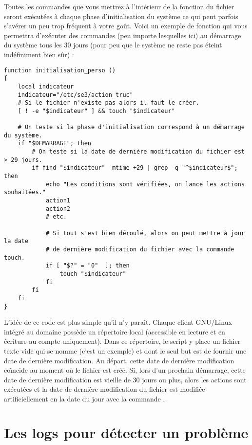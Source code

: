 Toutes les commandes que vous mettrez à l'intérieur de la fonction
 du fichier  seront
exécutées à chaque phase d'initialisation du système ce qui
peut parfois s'avérer un peu trop fréquent à votre goût.
Voici un exemple de fonction 
qui vous permettra d'exécuter des commandes (peu importe
lesquelles ici) au démarrage du système tous les 30 jours
(pour peu que le système ne reste pas éteint indéfiniment bien sûr) :
%
\begin{lstlisting}
function initialisation_perso ()
{
    local indicateur
    indicateur="/etc/se3/action_truc"
    # Si le fichier n'existe pas alors il faut le créer.
    [ ! -e "$indicateur" ] && touch "$indicateur"

    # On teste si la phase d'initialisation correspond à un démarrage du système.
    if "$DEMARRAGE"; then
        # On teste si la date de dernière modification du fichier est > 29 jours.
        if find "$indicateur" -mtime +29 | grep -q "^$indicateur$"; then
            echo "Les conditions sont vérifiées, on lance les actions souhaitées."
            action1
            action2
            # etc. 
            
            # Si tout s'est bien déroulé, alors on peut mettre à jour la date
            # de dernière modification du fichier avec la commande touch.
            if [ "$?" = "0"  ]; then
                touch "$indicateur"
            fi
        fi
    fi
}
\end{lstlisting}
%
L'idée de ce code est plus simple qu'il n'y paraît. Chaque client GNU/Linux
intégré au domaine possède un répertoire local 
(accessible en lecture et en écriture au compte 
uniquement). Dans ce répertoire, le script y place un fichier texte
vide qui se nomme  (c'est un exemple) et
dont le seul but est de fournir une date de dernière modification.
Au départ, cette date de dernière modification coïncide au
moment où le fichier est créé. Si, lors d'un prochain
démarrage, cette date de dernière modification est vieille de
30 jours ou plus, alors les actions sont exécutées et la date
de dernière modification du fichier 
est modifiée artificiellement en la date du jour avec la
commande .





\section{Les logs pour détecter un problème}

